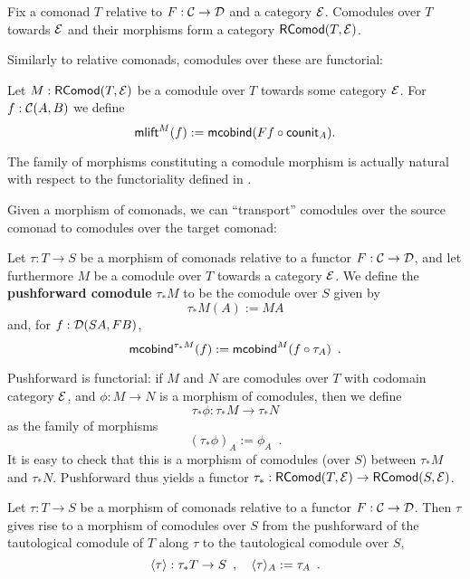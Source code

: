 \documentclass[conference,10pt]{IEEEtran}
\newcommand{\fat}[1]{\textbf{#1}}
\renewcommand{\alpha}{\phi}
\begin{document}
\begin{remark}
 Fix a comonad $T$ relative to $F:\C\to\D$ and a category $\E$.
 Comodules over $T$ towards $\E$ and their morphisms  form a category $\RComod(T,\E)$.
\end{remark}

Similarly to relative comonads, comodules over these are functorial:

\begin{definition}\label{def:comodule_lift}
 Let $M : \RComod(T,\E)$ be a comodule over $T$ towards some category $\E$. For $f : \C(A,B)$ we define
  \[ \mlift^M(f) := \mcobind(\comp{\counit_A}{Ff}) .  \]
\end{definition}


\begin{remark}
  The family of morphisms constituting a comodule morphism is actually natural with respect to the functoriality 
  defined in .
\end{remark}

Given a morphism of comonads, we can \enquote{transport} comodules over the source comonad to comodules over the target comonad:


\begin{definition}\label{def:pushforward_comodule} %
  Let $\tau : T\to S$ be a morphism of comonads relative to a functor $F : \C \to \D$, and let furthermore $M$ be a 
  comodule over $T$ towards a category $\E$. We define the \fat{pushforward comodule} $\tau_*M$ to be the comodule over $S$ given by
  \[  \tau_*M(A) := MA \]
  and, for $f : \D(SA,FB)$,
   \[ \mcobind^{\tau_*M}(f) := \mcobind^M(\comp{\tau_A}{f}) \enspace . \]
   
  \noindent
  Pushforward is functorial: if $M$ and $N$ are comodules over $T$ with codomain category $\E$, and $\alpha : M\to N$ is 
    a morphism of comodules, then we define \[\tau_*\alpha : \tau_*M \to \tau_*N\] 
    as the family of morphisms
     \[ (\tau_*\alpha)_A := \alpha_A \enspace . \]
  It is easy to check that this is a morphism of comodules (over $S$) between $\tau_*M$ and $\tau_*N$.
  Pushforward thus yields a functor $\tau_*:\RComod(T,\E) \to \RComod(S,\E)$.
\end{definition}


\begin{definition}\label{def:induced} %
  Let $\tau : T\to S$ be a morphism of comonads relative to a functor $F : \C \to \D$.
  Then $\tau$ gives rise to a morphism of comodules over $S$ from the pushforward of the tautological comodule
  of $T$ along $\tau$ to the tautological comodule over $S$,
  \[ \induced{\tau} : \tau_*T \to S \enspace , \quad \induced{\tau}_A := \tau_A \enspace . \]
\end{definition}
\end{document}
